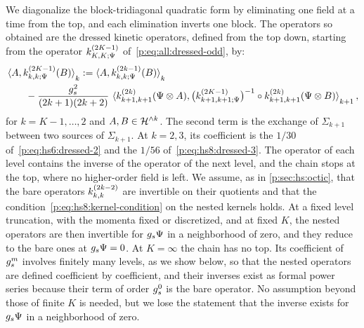 We diagonalize the block-tridiagonal quadratic form by eliminating one field at a time from the top, and each elimination inverts one block.
The operators so obtained are the dressed kinetic operators, defined from the top down, starting from the operator $\kin{K}{\Psi}{2 K - 1}$ of~\eqref{p:eq:all:dressed-odd}, by:
\begin{equation}
  \label{p:eq:all:nested}
  \begin{aligned}
    &
    \pair[k]{A}{\kin{k}{\Psi}{2 K - 1}(B)}
      := \pair[k]{A}{\kin{k}{\Psi}{2 k - 1}(B)}
    \\ &
    \qquad
    - \frac{\gs^2}{(2 k + 1) (2 k + 2)} \, \pair[k + 1]{\kin{k + 1}{}{2 k}(\Psi \otimes A)}{\big( \kin{k + 1}{\Psi}{2 K - 1} \big)^{-1} \circ \kin{k + 1}{}{2 k}(\Psi \otimes B)},
  \end{aligned}
\end{equation}
for $k = K - 1, \ldots, 2$ and $A, B \in \mathcal{H}^{\wedge k}$.
The second term is the exchange of $\Sigma_{k + 1}$ between two sources of $\Sigma_{k + 1}$.
  At $k = 2, 3$, its coefficient is the $1 / 30$ of~\eqref{p:eq:hs6:dressed-2} and the $1 / 56$ of~\eqref{p:eq:hs8:dressed-3}.
The operator of each level contains the inverse of the operator of the next level, and the chain stops at the top, where no higher-order field is left.
We assume, as in \cref{p:sec:hs:octic}, that the bare operators $\kin{k}{}{2 k - 2}$ are invertible on their quotients and that the condition~\eqref{p:eq:hs8:kernel-condition} on the nested kernels holds.
At a fixed level truncation, with the momenta fixed or discretized, and at fixed $K$, the nested operators are then invertible for $g_s \Psi$ in a neighborhood of zero, and they reduce to the bare ones at $g_s \Psi = 0$.
At $K = \infty$ the chain has no top.
Its coefficient of $g_s^m$ involves finitely many levels, as we show below, so that the nested operators are defined coefficient by coefficient, and their inverses exist as formal power series because their term of order $g_s^0$ is the bare operator.
No assumption beyond those of finite $K$ is needed, but we lose the statement that the inverse exists for $g_s \Psi$ in a neighborhood of zero.

